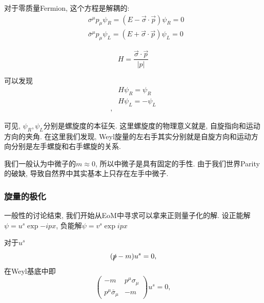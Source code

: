 对于零质量Fermion, 这个方程是解耦的:
\begin{align}
    &\sigma^\mu p_\mu\psi_R=(E-\vec\sigma\cdot\vec p)\psi_R=0\\
    &\bar\sigma^\mu p_\mu\psi_L=(E+\vec\sigma\cdot\vec p)\psi_L=0
\end{align}

\begin{definition}[螺旋度]
    \begin{equation}
        H=\frac{\vec\sigma\cdot\vec p}{|p|}
    \end{equation}
\end{definition}

可以发现
\begin{align}
    & H\psi_R=\psi_R\\
    & H\psi_L=-\psi_L\\,
\end{align}

可见, $\psi_R, \psi_L$分别是螺旋度的本征矢. 这里螺旋度的物理意义就是, 自旋指向和运动方向的夹角. 在这里我们发现, Weyl旋量的左右手其实分别就是自旋方向和运动方向分别是左手螺旋和右手螺旋的关系.

我们一般认为中微子的$m\approx0$, 所以中微子是具有固定的手性. 由于我们世界Parity的破缺, 导致自然界中其实基本上只存在左手中微子.

\subsubsection{旋量的极化}
一般性的讨论结束, 我们开始从EoM中寻求可以拿来正则量子化的解. 设正能解$\psi=u^s\exp{-ipx}$, 负能解$\psi=v^s\exp{ipx}$

对于$u^s$
\begin{equation}
    (\slashed p-m)u^s=0,
\end{equation}
在Weyl基底中即
\begin{equation}
    \begin{pmatrix}
        -m & p^\mu\sigma_\mu\\
        p^\mu\bar\sigma_\mu & -m
    \end{pmatrix}u^s=0,
\end{equation}

